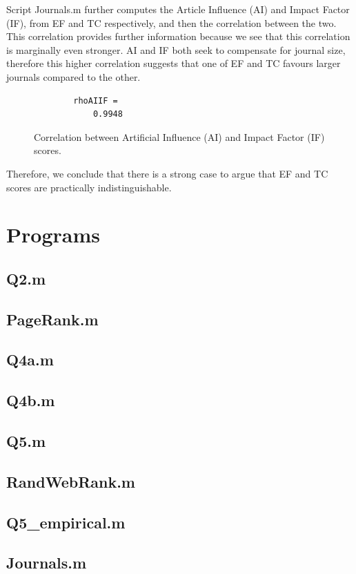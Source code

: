 \documentclass[a4paper]{article}
\begin{document}
\bigskip
Script Journals.m further computes the Article Influence (AI) and Impact Factor (IF), from EF and TC respectively, and then the correlation between the two. This correlation provides further information because we see that this correlation is marginally even stronger. AI and IF both seek to compensate for journal size, therefore this higher correlation suggests that one of EF and TC favours larger journals compared to the other.
\begin{figure}[H]
    \centering
    \begin{verbatim}
        rhoAIIF =
            0.9948
    \end{verbatim}
    \caption{Correlation between Artificial Influence (AI) and Impact Factor (IF) scores.}
    \label{fig:q7cor2}
\end{figure}

Therefore, we conclude that there is a strong case to argue that EF and TC scores are practically indistinguishable.

\pagebreak
\section*{Programs}

\subsection*{Q2.m}\label{PQ2}


\subsection*{PageRank.m}\label{PPageRank}


\newpage
\subsection*{Q4a.m}\label{PQ4a}


\subsection*{Q4b.m}\label{PQ4b}


\subsection*{Q5.m}\label{PQ5}


\newpage
\subsection*{RandWebRank.m}\label{PQ5rand}


\subsection*{Q5\_empirical.m}\label{PQ5emp}


\newpage
\subsection*{Journals.m}\label{Pjournals}

\end{document}
